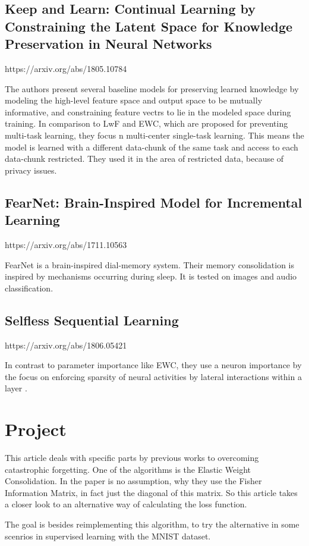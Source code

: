 \subsection*{Keep and Learn: Continual Learning by Constraining the Latent Space for Knowledge Preservation in Neural Networks}
https://arxiv.org/abs/1805.10784

The authors present several baseline models for preserving learned knowledge by modeling the high-level feature space and output space to be mutually informative, and constraining feature vectrs to lie in the modeled space during training.
In comparison to LwF and EWC, which are proposed for preventing multi-task learning, they focus n multi-center single-task learning.
This means the model is learned with a different data-chunk of the same task and access to each data-chunk restricted.
They used it in the area of restricted data, because of privacy issues.

\subsection*{FearNet: Brain-Inspired Model for Incremental Learning}
https://arxiv.org/abs/1711.10563

FearNet is a brain-inspired dial-memory system.
Their memory consolidation is inspired by mechanisms occurring during sleep.
It is tested on images and audio classification.

\subsection*{Selfless Sequential Learning}
https://arxiv.org/abs/1806.05421

In contrast to parameter importance like EWC, they use a neuron importance by the focus on enforcing sparsity of neural activities by lateral interactions within a layer \cite{cf_application_oriented_study}.


\section{Project}

This article deals with specific parts by previous works to overcoming catastrophic forgetting.
One of the algorithms is the Elastic Weight Consolidation.
In the paper is no assumption, why they use the Fisher Information Matrix, in fact just the diagonal of this matrix.
So this article takes a closer look to an alternative way of calculating the loss function.

The goal is besides reimplementing this algorithm, to try the alternative in some scenrios in supervised learning with the MNIST dataset.
